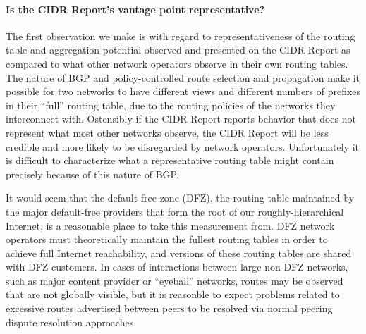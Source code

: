 \paragraph{Is the CIDR Report's vantage point representative?}
The first observation we make is with regard to representativeness of the
routing table and aggregation potential observed and presented on the CIDR
Report as compared to what other network operators observe in their own routing
tables. The nature of BGP and policy-controlled route selection and propagation
make it possible for two networks to have different views and different numbers
of prefixes in their ``full'' routing table, due to the routing policies of the
networks they interconnect with. Ostensibly if the CIDR Report reports behavior
that does not represent what most other networks observe, the CIDR Report will
be less credible and more likely to be disregarded by network operators.
Unfortunately it is difficult to characterize what a representative routing
table might contain precisely because of this nature of BGP.

It would seem that the default-free zone (DFZ), the routing table maintained by
the major default-free providers that form the root of our roughly-hierarchical
Internet, is a reasonable place to take this measurement from. DFZ network
operators must theoretically maintain the fullest routing tables in order to
achieve full Internet reachability, and versions of these routing tables are
shared with DFZ customers. In cases of interactions between large
non-DFZ networks, such as major content provider or ``eyeball'' networks,
routes may be observed that are not globally visible, but it is reasonble to
expect problems related to excessive routes advertised between peers to be
resolved via normal peering dispute resolution approaches.

